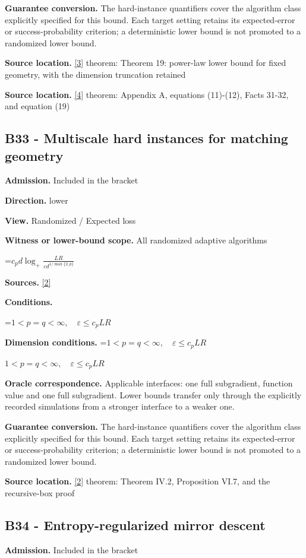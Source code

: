 \documentclass[10pt,a4paper]{article}
\newcommand{\AtlasMath}[1]{\par\begingroup\centering\setbox0=\hbox{$\displaystyle #1$}\ifdim\wd0>1.4\linewidth\typeout{ATLAS WIDE FORMULA: \the\wd0}\fi\ifdim\wd0>\linewidth\resizebox{\linewidth}{!}{\box0}\else\box0\fi\par\endgroup}
\newcommand{\AtlasInlineMath}[1]{\begingroup\setbox0=\hbox{$#1$}\ifdim\wd0>.4\linewidth\endgroup\AtlasMath{#1}\else\endgroup$#1$\fi}
\begin{document}
\textbf{Guarantee conversion.} The hard-instance quantifiers cover the algorithm class explicitly specified for this bound. Each target setting retains its expected-error or success-probability criterion; a deterministic lower bound is not promoted to a randomized lower bound.

\textbf{Source location.} \href{https://arxiv.org/pdf/2609.20701}{[3]} theorem: Theorem 19: power-law lower bound for fixed geometry, with the dimension truncation retained

\textbf{Source location.} \href{https://arxiv.org/pdf/2609.20687}{[4]} theorem: Appendix A, equations (11)-(12), Facts 31-32, and equation (19)

\subsection{B33 - Multiscale hard instances for matching geometry}
\textbf{Admission.} Included in the bracket

\textbf{Direction.} lower

\textbf{View.} Randomized / Expected loss

\textbf{Witness or lower-bound scope.} All randomized adaptive algorithms

\AtlasMath{c_p d\log_+\frac{LR}{\varepsilon d^{1/\max\{2,p\}}}}
\textbf{Sources.} \href{https://arxiv.org/pdf/1407.5144}{[2]}

\textbf{Conditions.} 
\AtlasMath{1<p=q<\infty,\quad\varepsilon\le c_p LR}


\textbf{Dimension conditions.} \AtlasInlineMath{1<p=q<\infty,\quad\varepsilon\le c_p LR}

\textbf{Oracle correspondence.} Applicable interfaces: one full subgradient, function value and one full subgradient. Lower bounds transfer only through the explicitly recorded simulations from a stronger interface to a weaker one.

\textbf{Guarantee conversion.} The hard-instance quantifiers cover the algorithm class explicitly specified for this bound. Each target setting retains its expected-error or success-probability criterion; a deterministic lower bound is not promoted to a randomized lower bound.

\textbf{Source location.} \href{https://arxiv.org/pdf/1407.5144}{[2]} theorem: Theorem IV.2, Proposition VI.7, and the recursive-box proof

\subsection{B34 - Entropy-regularized mirror descent}
\textbf{Admission.} Included in the bracket
\end{document}
